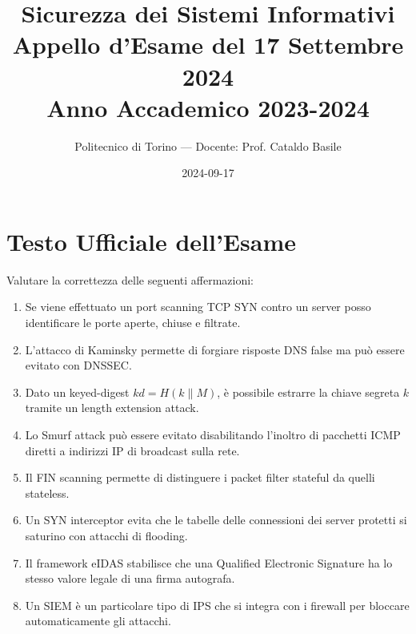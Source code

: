 \documentclass[11pt,a4paper]{article}
\begin{document}
\title{\textbf{Sicurezza dei Sistemi Informativi} \\ \large Appello d'Esame del 17 Settembre 2024 \\ \small Anno Accademico 2023-2024}
\author{Politecnico di Torino --- Docente: Prof. Cataldo Basile}
\date{2024-09-17}
\maketitle


\section{Testo Ufficiale dell'Esame}

\begin{questionbox}
Valutare la correttezza delle seguenti affermazioni:
\begin{enumerate}[label=\alph*.]
    \item Se viene effettuato un port scanning TCP SYN contro un server posso identificare le porte aperte, chiuse e filtrate.
    \item L'attacco di Kaminsky permette di forgiare risposte DNS false ma pu\`o essere evitato con DNSSEC.
    \item Dato un keyed-digest $kd = H(k \parallel M)$, \`e possibile estrarre la chiave segreta $k$ tramite un length extension attack.
    \item Lo Smurf attack pu\`o essere evitato disabilitando l'inoltro di pacchetti ICMP diretti a indirizzi IP di broadcast sulla rete.
    \item Il FIN scanning permette di distinguere i packet filter stateful da quelli stateless.
    \item Un SYN interceptor evita che le tabelle delle connessioni dei server protetti si saturino con attacchi di flooding.
    \item Il framework eIDAS stabilisce che una Qualified Electronic Signature ha lo stesso valore legale di una firma autografa.
    \item Un SIEM \`e un particolare tipo di IPS che si integra con i firewall per bloccare automaticamente gli attacchi.
\end{enumerate}
\end{questionbox}
\end{document}
